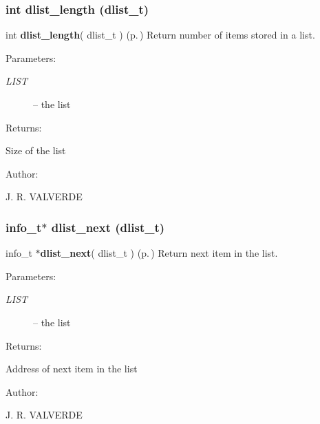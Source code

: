 \subsubsection{\setlength{\rightskip}{0pt plus 5cm}int dlist\_\-length ({\bf dlist\_\-t})}\label{P__dlist_8h_a9}


int {\bf dlist\_\-length}( dlist\_\-t ) {\rm (p.\,\pageref{P__dlist_8h_a9})} Return number of items stored in a list.

\begin{Desc}
\item[Parameters: ]\par
\begin{description}
\item[{\em 
LIST}]-- the list \end{description}
\end{Desc}
\begin{Desc}
\item[Returns: ]\par
Size of the list\end{Desc}
\begin{Desc}
\item[Author: ]\par
J. R. VALVERDE \end{Desc}
\subsubsection{\setlength{\rightskip}{0pt plus 5cm}info\_\-t$\ast$ dlist\_\-next ({\bf dlist\_\-t})}\label{P__dlist_8h_a13}


info\_\-t $\ast${\bf dlist\_\-next}( dlist\_\-t ) {\rm (p.\,\pageref{P__dlist_8h_a13})} Return next item in the list.

\begin{Desc}
\item[Parameters: ]\par
\begin{description}
\item[{\em 
LIST}]-- the list \end{description}
\end{Desc}
\begin{Desc}
\item[Returns: ]\par
Address of next item in the list\end{Desc}
\begin{Desc}
\item[Author: ]\par
J. R. VALVERDE \end{Desc}

